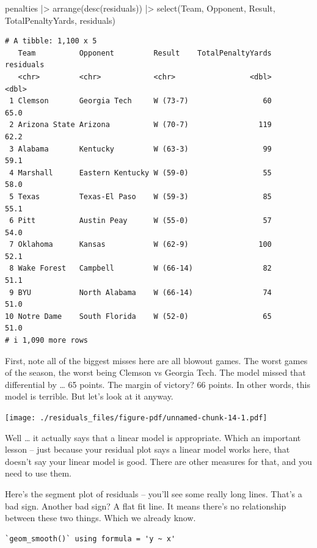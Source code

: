 \documentclass[
  letterpaper,
  DIV=11,
  numbers=noendperiod]{scrreprt}
\newenvironment{Shaded}{\begin{snugshade}}{\end{snugshade}}
\newcommand{\FunctionTok}[1]{\textcolor[rgb]{0.28,0.35,0.67}{#1}}
\newcommand{\NormalTok}[1]{\textcolor[rgb]{0.00,0.23,0.31}{#1}}
\newcommand{\SpecialCharTok}[1]{\textcolor[rgb]{0.37,0.37,0.37}{#1}}
\begin{document}
\begin{Shaded}
\begin{Highlighting}[]
\NormalTok{penalties }\SpecialCharTok{|\textgreater{}} \FunctionTok{arrange}\NormalTok{(}\FunctionTok{desc}\NormalTok{(residuals)) }\SpecialCharTok{|\textgreater{}} \FunctionTok{select}\NormalTok{(Team, Opponent, Result, TotalPenaltyYards, residuals)}
\end{Highlighting}
\end{Shaded}

\begin{verbatim}
# A tibble: 1,100 x 5
   Team          Opponent         Result    TotalPenaltyYards residuals
   <chr>         <chr>            <chr>                 <dbl>     <dbl>
 1 Clemson       Georgia Tech     W (73-7)                 60      65.0
 2 Arizona State Arizona          W (70-7)                119      62.2
 3 Alabama       Kentucky         W (63-3)                 99      59.1
 4 Marshall      Eastern Kentucky W (59-0)                 55      58.0
 5 Texas         Texas-El Paso    W (59-3)                 85      55.1
 6 Pitt          Austin Peay      W (55-0)                 57      54.0
 7 Oklahoma      Kansas           W (62-9)                100      52.1
 8 Wake Forest   Campbell         W (66-14)                82      51.1
 9 BYU           North Alabama    W (66-14)                74      51.0
10 Notre Dame    South Florida    W (52-0)                 65      51.0
# i 1,090 more rows
\end{verbatim}

First, note all of the biggest misses here are all blowout games. The
worst games of the season, the worst being Clemson vs Georgia Tech. The
model missed that differential by \ldots{} 65 points. The margin of
victory? 66 points. In other words, this model is terrible. But let's
look at it anyway.

\texttt{[image: ./residuals\_files/figure-pdf/unnamed-chunk-14-1.pdf]}

Well \ldots{} it actually says that a linear model is appropriate. Which
an important lesson -- just because your residual plot says a linear
model works here, that doesn't say your linear model is good. There are
other measures for that, and you need to use them.

Here's the segment plot of residuals -- you'll see some really long
lines. That's a bad sign. Another bad sign? A flat fit line. It means
there's no relationship between these two things. Which we already know.

\begin{verbatim}
`geom_smooth()` using formula = 'y ~ x'
\end{verbatim}
\end{document}
